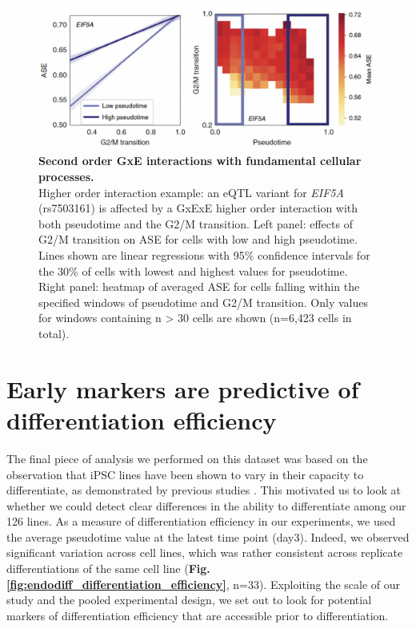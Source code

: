 \begin{figure}[h]
\centering
\includegraphics[width=15.5cm]{Chapter4/Fig/endodiff_GxExE.png}
\caption[Second order GxE interactions with fundamental cellular processes]{\textbf{Second order GxE interactions with fundamental cellular processes.}\\
Higher order interaction example: an eQTL variant for \textit{EIF5A} (rs7503161) is affected by a GxExE higher order interaction with both pseudotime and the G2/M transition. 
Left panel: effects of G2/M transition on ASE for cells with low and high pseudotime. 
Lines shown are linear regressions with 95\% confidence intervals for the 30\% of cells with lowest and highest values for pseudotime. 
Right panel: heatmap of averaged ASE for cells falling within the specified windows of pseudotime and G2/M transition. 
Only values for windows containing n > 30 cells are shown (n=6,423 cells in total).}
\label{fig:endodiff_gxexe}
\end{figure}

\newpage

\section{Early markers are predictive of differentiation efficiency}
\label{sec:endodiff_differentiation_efficiency}

The final piece of analysis we performed on this dataset was based on the observation that iPSC lines have been shown to vary in their capacity to differentiate, as demonstrated by previous studies \cite{bock2011reference}.
This motivated us to look at whether we could detect clear differences in the ability to differentiate among our 126 lines.
As a measure of differentiation efficiency in our experiments, we used the average pseudotime value at the latest time point (day3).
Indeed, we observed significant variation across cell lines, which was rather consistent across replicate differentiations of the same cell line (\textbf{Fig. \ref{fig:endodiff_differentiation_efficiency}}, n=33).
Exploiting the scale of our study and the pooled experimental design, we set out to look for potential markers of differentiation efficiency that are accessible prior to differentiation.

